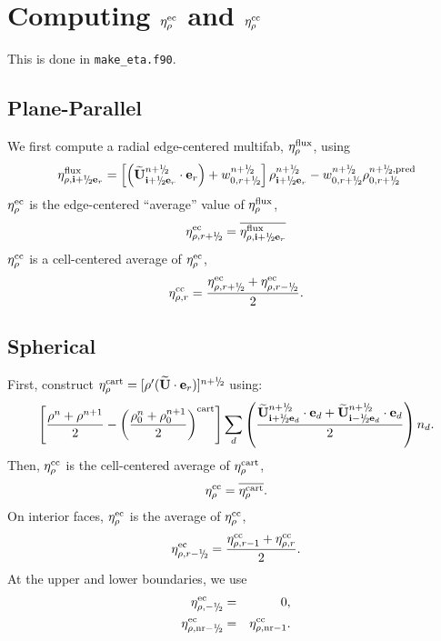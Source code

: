 \section{Computing $\eta_{\rho}^{\rm ec}$ and $\eta_{\rho}^{\rm cc}$}
This is done in {\tt make\_eta.f90}.

\subsection{Plane-Parallel}
We first compute a radial edge-centered multifab, $\eta_{\rho}^{\rm flux}$, using
\begin{equation}
\eta_{\rho,\ib+\myhalf\eb_r}^{\rm flux} = \left[\left(\Ubt_{\ib+\myhalf\eb_r}^{n+\myhalf}\cdot\eb_r\right) + w_{0,r+\myhalf}^{n+\myhalf}\right] \rho_{\ib+\myhalf\eb_r}^{n+\myhalf} - w_{0,r+\myhalf}^{n+\myhalf}\rho_{0,r+\myhalf}^{n+\myhalf, {\rm pred}}
\end{equation}
$\eta_{\rho}^{\rm ec}$ is the edge-centered ``average'' value of $\eta_{\rho}^{\rm flux}$,
\begin{equation}
\eta_{\rho,r+\myhalf}^{\rm ec} = \overline{\eta_{\rho,\ib+\myhalf\eb_r}^{\rm flux}}
\end{equation}
$\eta_{\rho}^{\rm cc}$ is a cell-centered average of $\eta_{\rho}^{\rm ec}$,
\begin{equation}
\eta_{\rho,r}^{\rm cc} = \frac{\eta_{\rho,r+\myhalf}^{\rm ec} + \eta_{\rho,r-\myhalf}^{\rm ec}}{2}.
\end{equation}

\subsection{Spherical}\label{Sec:eta Spherical}
First, construct $\eta_{\rho}^{\rm cart} =
[\rho'(\Ubt\cdot\eb_r)]^{n+\myhalf}$ using:
\begin{equation}
\left[\frac{\rho^n+\rho^{n+1}}{2}-\left(\frac{\rho_0^n+\rho_0^{n+1}}{2}\right)^{\rm cart}\right] \sum_d\left(\frac{\Ubt_{\ib+\myhalf\eb_d}^{n+\myhalf}\cdot\eb_d+\Ubt_{\ib-\myhalf\eb_d}^{n+\myhalf}\cdot\eb_d}{2}\right)n_d.
\end{equation}
Then, $\eta_{\rho}^{\rm cc}$ is the cell-centered average of $\eta_{\rho}^{\rm cart}$,
\begin{equation}
\eta_{\rho}^{\rm cc} = \overline{\eta_{\rho}^{\rm cart}}.
\end{equation}
On interior faces, $\eta_{\rho}^{\rm ec}$ is the average of $\eta_{\rho}^{\rm cc}$,
\begin{equation}
\eta_{\rho,r-\myhalf}^{\rm ec} = \frac{\eta_{\rho,r-1}^{\rm cc} + \eta_{\rho,r}^{\rm cc}}{2}.
\end{equation}
At the upper and lower boundaries, we use
\begin{eqnarray}
\eta_{\rho,-\myhalf}^{\rm ec} &=& 0, \\
\eta_{\rho,{\rm nr}-\myhalf}^{\rm ec} &=& \eta_{\rho,{\rm nr}-1}^{\rm cc}.
\end{eqnarray}

